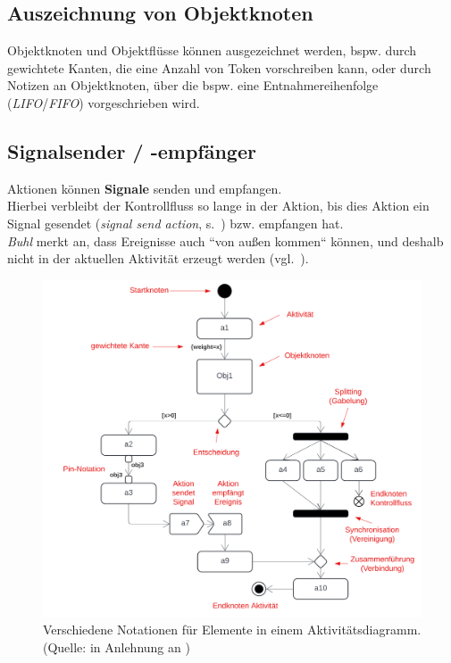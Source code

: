 \subsection{Auszeichnung von Objektknoten}
Objektknoten und Objektflüsse können ausgezeichnet werden, bspw. durch gewichtete Kanten, die eine Anzahl von Token vorschreiben kann, oder durch Notizen an Objektknoten, über die bspw. eine Entnahmereihenfolge (\textit{LIFO}/\textit{FIFO}) vorgeschrieben wird.

\subsection{Signalsender / -empfänger}
Aktionen können \textbf{Signale} senden und empfangen.\\
Hierbei verbleibt der Kontrollfluss so lange in der Aktion, bis dies Aktion ein Signal gesendet (\textit{signal send action}, s.~\cite[76]{Buh09}) bzw. empfangen hat.\\
\textit{Buhl} merkt an, dass Ereignisse auch ``von außen kommen`` können, und deshalb nicht in der aktuellen Aktivität erzeugt werden (vgl.~\cite[63]{Buh09}).


\begin{figure}
    \centering
    \includegraphics[scale=0.35]{part three/Aktivitätsdiagramme/img/aktivitätsdiagramm-notation}
    \caption{Verschiedene Notationen für Elemente in einem Aktivitätsdiagramm. (Quelle: in Anlehnung an \cite[326, Abb. 6.9-16]{Bal05})}
    \label{fig:aktivitätsdiagramm-notation}
\end{figure}